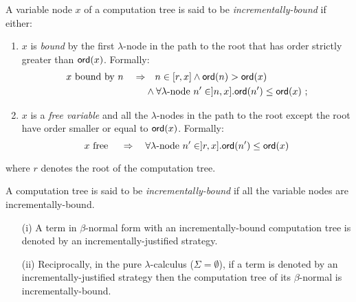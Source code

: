 \documentclass{llncs}
\newcommand\ord[1]{{\sf ord}(#1)}
\newcommand{\tree}[2][levelsep=3.5ex]{\pstree[levelsep=3ex,#1]{\TR{#2}}}
\newcommand\imp{\Rightarrow}
\begin{document}
\begin{definition}
A variable node $x$ of a computation tree is said to be
\emph{incrementally-bound} if either:
\begin{enumerate}
\item $x$ is \emph{bound} by the first $\lambda$-node in the path to the root that has
order strictly greater than $\ord{x}$. Formally:
\begin{align*}
 x \mbox{ bound by } n \quad \imp & \quad n \in [r,x] \wedge \ord{n} > \ord{x} \\
                                  & \wedge \forall \lambda\mbox{-node } n' \in ]n,x] . \ord{n'} \leq \ord{x} \ ;
\end{align*}

\item $x$ is a \emph{free variable} and all the $\lambda$-nodes in the path to the root except the root have order
smaller or equal to $\ord{x}$. Formally:
$$ x \mbox{ free } \quad \imp \quad  \forall \lambda\mbox{-node } n' \in ]r,x] . \ord{n'} \leq \ord{x}$$
\end{enumerate}
where $r$ denotes the root of the computation tree.

A computation tree is said to be \emph{incrementally-bound} if all
the variable nodes are incrementally-bound.
\end{definition}

\begin{proposition}
\label{prop:incrbound_imp_incrjustified}
\begin{enumerate}
\item[(i)] A term in $\beta$-normal form with an incrementally-bound computation tree is denoted by an incrementally-justified strategy.
\item[(ii)] Reciprocally, in the pure $\lambda$-calculus ($\Sigma=\emptyset$), if a term is denoted by an incrementally-justified strategy then the computation tree of its $\beta$-normal is incrementally-bound.
\end{enumerate}
\end{proposition}

\parpic[r]{
    \tree{$\lambda x^3$}{\tree{$f^2$}{ \tree{$\lambda y^1$}{ \TR{$x^0$} }}}
}
\end{document}

